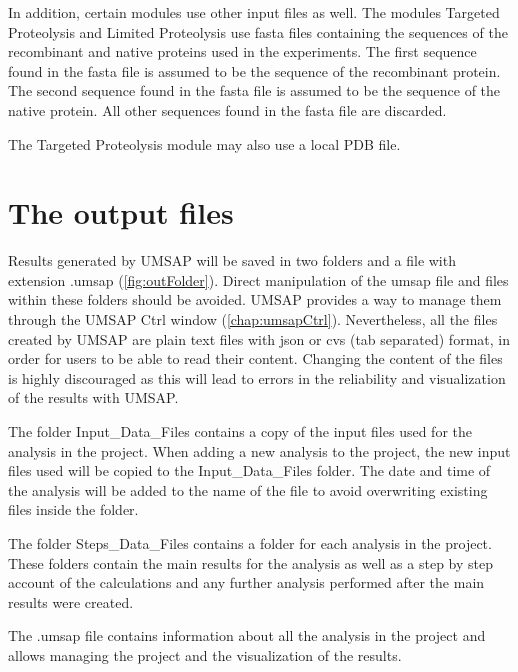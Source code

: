 In addition, certain modules use other input files as well. The modules Targeted
Proteolysis and Limited Proteolysis use fasta files containing the sequences of
the recombinant and native proteins used in the experiments. The first sequence
found in the fasta file is assumed to be the sequence of the recombinant protein.
The second sequence found in the fasta file is assumed to be the sequence of the
native protein. All other sequences found in the fasta file are discarded.

The Targeted Proteolysis module may also use a local PDB file. 

\section{The output files}
\label{sec:outFile}

Results generated by UMSAP will be saved in two folders and a file with extension
.umsap (\autoref{fig:outFolder}). Direct manipulation of the umsap file and files
within these folders should be avoided. UMSAP provides a way to manage them through
the UMSAP Ctrl window (\autoref{chap:umsapCtrl}). Nevertheless, all the files created
by UMSAP are plain text files with json or cvs (tab separated) format, in order for
users to be able to read their content. Changing the content of the files is highly
discouraged as this will lead to errors in the reliability and visualization of the
results with UMSAP.

The folder Input{\_}Data{\_}Files contains a copy of the input files used for the analysis
in the project. When adding a new analysis to the project, the new input files used
will be copied to the Input{\_}Data{\_}Files folder. The date and time of the analysis will
be added to the name of the file to avoid overwriting existing files inside the folder.

The folder Steps{\_}Data{\_}Files contains a folder for each analysis in the project.
These folders contain the main results for the analysis as well as a step by step
account of the calculations and any further analysis performed after the main results
were created.

The .umsap file contains information about all the analysis in the project and allows
managing the project and the visualization of the results.

